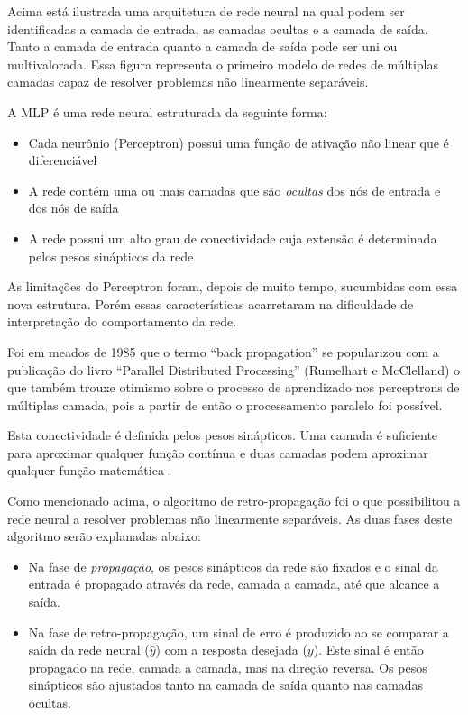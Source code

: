 Acima está ilustrada uma arquitetura de rede neural na qual podem ser identificadas a camada de entrada, as camadas ocultas e a camada de saída. Tanto a camada de entrada quanto a camada de saída pode ser uni ou multivalorada. Essa figura representa o primeiro modelo de redes de múltiplas camadas capaz de resolver problemas não linearmente separáveis.

A MLP é uma rede neural estruturada da seguinte forma:
\begin{itemize}
    \item Cada neurônio (Perceptron) possui uma função de ativação não linear que é diferenciável
    \item A rede contém uma ou mais camadas que são \textit{ocultas} dos nós de entrada e dos nós de saída
    \item A rede possui um alto grau de conectividade cuja extensão é determinada pelos pesos sinápticos da rede
\end{itemize}

As limitações do Perceptron foram, depois de muito tempo, sucumbidas com essa nova estrutura. Porém essas características acarretaram na dificuldade de interpretação do comportamento da rede.

Foi em meados de 1985 que o termo ``back propagation'' se popularizou com a publicação do livro ``Parallel Distributed Processing'' (Rumelhart e McClelland) o que também trouxe otimismo sobre o processo de aprendizado nos perceptrons de múltiplas camada, pois a partir de então o processamento paralelo foi possível.

Esta conectividade é definida pelos pesos sinápticos. Uma camada é suficiente para aproximar qualquer função contínua e duas
camadas podem aproximar qualquer função matemática \cite{cybenko1989approximation}.


Como mencionado acima, o algoritmo de retro-propagação foi o que possibilitou a rede neural a resolver problemas não linearmente separáveis. As duas fases deste algoritmo serão explanadas abaixo:

\begin{itemize}
    \item Na fase de \textit{propagação}, os pesos sinápticos da rede são fixados e o sinal da entrada é propagado através da rede, camada a camada, até que alcance a saída.
    \item Na fase de retro-propagação, um sinal de erro é produzido ao se comparar a saída da rede neural ($\hat{y}$) com a resposta desejada ($y$). Este sinal é então propagado na rede, camada a camada, mas na direção reversa. Os pesos sinápticos são ajustados tanto na camada de saída quanto nas camadas ocultas.
\end{itemize}

